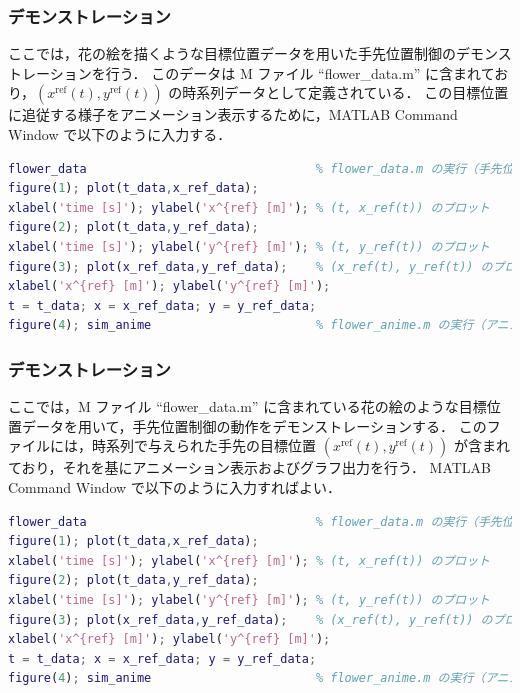 \subsubsection{デモンストレーション}

ここでは，花の絵を描くような目標位置データを用いた手先位置制御のデモンストレーションを行う．
このデータは M ファイル ``flower\_data.m'' に含まれており，$(x^{\mathrm{ref}}(t), y^{\mathrm{ref}}(t))$ の時系列データとして定義されている．
この目標位置に追従する様子をアニメーション表示するために，MATLAB Command Window で以下のように入力する．

\begin{lstlisting}[language=Matlab]
flower_data                                % flower_data.m の実行（手先位置の目標値設定）
figure(1); plot(t_data,x_ref_data); 
xlabel('time [s]'); ylabel('x^{ref} [m]'); % (t, x_ref(t)) のプロット
figure(2); plot(t_data,y_ref_data); 
xlabel('time [s]'); ylabel('y^{ref} [m]'); % (t, y_ref(t)) のプロット
figure(3); plot(x_ref_data,y_ref_data);    % (x_ref(t), y_ref(t)) のプロット
xlabel('x^{ref} [m]'); ylabel('y^{ref} [m]');
t = t_data; x = x_ref_data; y = y_ref_data;
figure(4); sim_anime                       % flower_anime.m の実行（アニメーション）
\end{lstlisting}

\subsubsection{デモンストレーション}

ここでは，M ファイル ``flower\_data.m'' に含まれている花の絵のような目標位置データを用いて，手先位置制御の動作をデモンストレーションする．
このファイルには，時系列で与えられた手先の目標位置 $(x^{\mathrm{ref}}(t), y^{\mathrm{ref}}(t))$ が含まれており，それを基にアニメーション表示およびグラフ出力を行う．
MATLAB Command Window で以下のように入力すればよい．

\begin{lstlisting}[language=Matlab]
flower_data                                % flower_data.m の実行（手先位置の目標値設定）
figure(1); plot(t_data,x_ref_data); 
xlabel('time [s]'); ylabel('x^{ref} [m]'); % (t, x_ref(t)) のプロット
figure(2); plot(t_data,y_ref_data); 
xlabel('time [s]'); ylabel('y^{ref} [m]'); % (t, y_ref(t)) のプロット
figure(3); plot(x_ref_data,y_ref_data);    % (x_ref(t), y_ref(t)) のプロット
xlabel('x^{ref} [m]'); ylabel('y^{ref} [m]');
t = t_data; x = x_ref_data; y = y_ref_data;
figure(4); sim_anime                       % flower_anime.m の実行（アニメーション）
\end{lstlisting}

